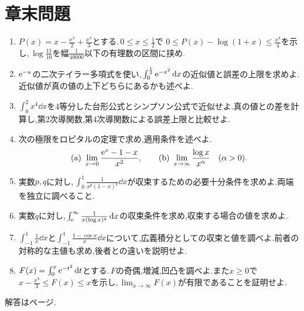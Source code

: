 \section*{章末問題}
\begin{enumerate}[label=\textbf{\thechapter.\arabic*},leftmargin=*]
 \item\label{問:十一対数近似}
 $P(x)=x-\frac{x^2}{2}+\frac{x^3}{3}$とする.\,$0\le x\le\frac12$で
 $0\le P(x)-\log(1+x)\le\frac{x^4}{4}$を示し,\,$\log\frac{11}{10}$を幅$\frac1{40000}$以下の有理数の区間に挟め.
 \item\label{問:十一指数積分近似}
 $\mathrm{e}^{-u}$の二次テイラー多項式を使い,\,$\int_0^{\frac12}\mathrm{e}^{-x^2}\,\mathrm{d} x$の近似値と誤差の上限を求めよ.近似値が真の値の上下どちらにあるかも述べよ.
 \item\label{問:十一数値積分}
 $\int_0^2x^4\dd x$を4等分した台形公式とシンプソン公式で近似せよ.真の値との差を計算し,第2次導関数,第4次導関数による誤差上限と比較せよ.
 \item\label{問:十一ロピタル}
 次の極限をロピタルの定理で求め,適用条件を述べよ.
 \[
 \text{(a)}\ \lim_{x\to0}\frac{\mathrm{e}^x-1-x}{x^2},
 \qquad
 \text{(b)}\ \lim_{x\to\infty}\frac{\log x}{x^{\alpha}}\quad(\alpha>0).
 \]
 \item\label{問:十一両端比較}
 実数$p,q$に対し,\,$\int_0^1\frac1{x^p(1-x)^q}\dd x$が収束するための必要十分条件を求めよ.両端を独立に調べること.
 \item\label{問:十一対数尾部}
 実数$q$に対し,\,$\int_{\mathrm{e}}^{\infty}\frac1{x(\log x)^q}\,\mathrm{d} x$の収束条件を求め,収束する場合の値を求めよ.
 \item\label{問:十一主値区別}
 $\int_{-1}^1\frac1x\dd x$と$\int_{-1}^1\frac{1-\cos x}{x}\dd x$について,広義積分としての収束と値を調べよ.前者の対称的な主値も求め,後者との違いを説明せよ.
 \item\label{問:十一積分定義関数}
 $F(x)=\int_0^x\mathrm{e}^{-t^2}\,\mathrm{d} t$とする.\,$F$の奇偶,増減,凹凸を調べよ.また$x\ge0$で$x-\frac{x^3}{3}\le F(x)\le x$を示し,\,$\lim_{x\to\infty}F(x)$が有限であることを証明せよ.
\end{enumerate}

\smallskip\noindent 解答は\pageref{解答:第12章}ページ.

